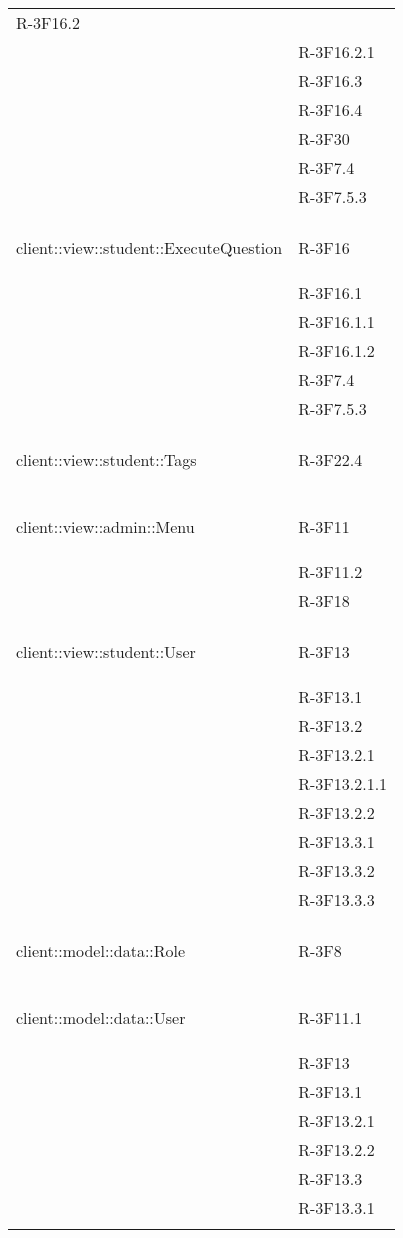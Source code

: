 \begin{longtable}{l p{3cm}}
R-3F16.2 \tabularnewline &

R-3F16.2.1 \tabularnewline &

R-3F16.3 \tabularnewline &

R-3F16.4 \tabularnewline &

R-3F30 \tabularnewline &

R-3F7.4 \tabularnewline &

R-3F7.5.3 \tabularnewline &\tabularnewline
\midrule
\hypertarget{client::view::student::ExecuteQuestion}{client::view::student::ExecuteQuestion} & R-3F16 \tabularnewline &

R-3F16.1 \tabularnewline &

R-3F16.1.1 \tabularnewline &

R-3F16.1.2 \tabularnewline &

R-3F7.4 \tabularnewline &

R-3F7.5.3 \tabularnewline &\tabularnewline
\midrule
\hypertarget{client::view::student::Tags}{client::view::student::Tags} & R-3F22.4 \tabularnewline &\tabularnewline
\midrule
\hypertarget{client::view::admin::Menu}{client::view::admin::Menu} & R-3F11 \tabularnewline &

R-3F11.2 \tabularnewline &

R-3F18 \tabularnewline &\tabularnewline
\midrule
\hypertarget{client::view::student::User}{client::view::student::User} & R-3F13 \tabularnewline &

R-3F13.1 \tabularnewline &

R-3F13.2 \tabularnewline &

R-3F13.2.1 \tabularnewline &

R-3F13.2.1.1 \tabularnewline &

R-3F13.2.2 \tabularnewline &

R-3F13.3.1 \tabularnewline &

R-3F13.3.2 \tabularnewline &

R-3F13.3.3 \tabularnewline &\tabularnewline
\midrule
\hypertarget{client::model::data::Role}{client::model::data::Role} & R-3F8 \tabularnewline &\tabularnewline
\midrule
\hypertarget{client::model::data::User}{client::model::data::User} & R-3F11.1 \tabularnewline &

R-3F13 \tabularnewline &

R-3F13.1 \tabularnewline &

R-3F13.2.1 \tabularnewline &

R-3F13.2.2 \tabularnewline &

R-3F13.3 \tabularnewline &

R-3F13.3.1 \tabularnewline &


\end{longtable}
